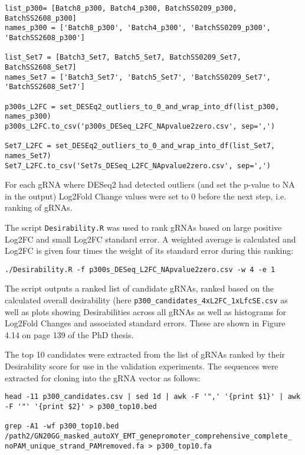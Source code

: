 \begin{small}
\begin{lstlisting}
list_p300= [Batch8_p300, Batch4_p300, BatchSS0209_p300, BatchSS2608_p300]
names_p300 = ['Batch8_p300', 'Batch4_p300', 'BatchSS0209_p300', 'BatchSS2608_p300']

list_Set7 = [Batch3_Set7, Batch5_Set7, BatchSS0209_Set7, BatchSS2608_Set7]
names_Set7 = ['Batch3_Set7', 'Batch5_Set7', 'BatchSS0209_Set7', 'BatchSS2608_Set7']

p300s_L2FC = set_DESEq2_outliers_to_0_and_wrap_into_df(list_p300, names_p300)
p300s_L2FC.to_csv('p300s_DESeq_L2FC_NApvalue2zero.csv', sep=',')

Set7_L2FC = set_DESEq2_outliers_to_0_and_wrap_into_df(list_Set7, names_Set7)
Set7_L2FC.to_csv('Set7s_DESeq_L2FC_NApvalue2zero.csv', sep=',')
\end{lstlisting}\end{small}

For each gRNA where DESeq2 had detected outliers (and set the p-value to NA in the output) Log2Fold Change values were set to 0 before the next step, i.e. ranking of gRNAs.

The script \verb|Desirability.R| was used to rank gRNAs based on large positive Log2FC and small Log2FC standard error. A weighted average is calculated and Log2FC is given four times the weight of its standard error during this ranking:

\begin{small}\begin{lstlisting}
./Desirability.R -f p300s_DESeq_L2FC_NApvalue2zero.csv -w 4 -e 1
\end{lstlisting}\end{small}

The script outputs a ranked list of candidate gRNAs, ranked based on the calculated overall desirability  (here \verb|p300_candidates_4xL2FC_1xLfcSE.csv| as well as plots showing Desirabilities across all gRNAs as well as histograms for Log2Fold Changes and associated standard errors. These are shown in Figure 4.14 on page 139 of the PhD thesis.

The top 10 candidates were extracted from the list of gRNAs ranked by their Desirability score for use in the validation experiments. The sequences were extracted for cloning into the gRNA vector as follows:

\begin{small}\begin{lstlisting}
head -11 p300_candidates.csv | sed 1d | awk -F '",' '{print $1}' | awk -F '"' '{print $2}' > p300_top10.bed

grep -A1 -wf p300_top10.bed /path2/GN20GG_masked_autoXY_EMT_genepromoter_comprehensive_complete_
noPAM_unique_strand_PAMremoved.fa > p300_top10.fa
\end{lstlisting}\end{small}


